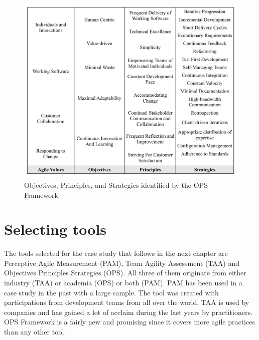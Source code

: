 \begin{figure} [H]
\centerline{\includegraphics[scale=0.75]{include/relatedwork/fig/ops.pdf}}
\caption{Objectives, Principles, and Strategies identified by the \ac{OPS} Framework} 
\label{objectives_principles_strategies}
\end{figure} 

%



\section{Selecting tools}
The tools selected for the case study that follows in the next chapter are Perceptive Agile Measurement (PAM), Team Agility Assessment (TAA) and Objectives Principles Strategies (OPS). All three of them originate from either industry (\ac{TAA}) or academia (\ac{OPS}) or both (\ac{PAM}). \ac{PAM} has been used in a case study in the past with a large sample. The tool was created with participations from development teams from all over the world. \ac{TAA} is used by companies and has gained a lot of acclaim during the last years by practitioners. \ac{OPS} Framework is a fairly new and promising since it covers more agile practices than any other tool.


